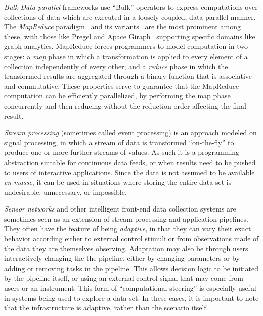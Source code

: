 {\em Bulk Data-parallel} frameworks use ``Bulk'' operators to express computations over 
collections of data which are executed in a loosely-coupled, data-parallel manner.
The {\em MapReduce} paradigm~\cite{MapReduce} and its variants~\cite{twister,hmr} are the most
prominent among these, with those like Pregel and Apace Giraph~\cite{pregel} supporting specific domains like
graph analytics. MapReduce forces programmers to model computation in two stages: 
a \emph{map} phase in which a transformation is applied to every element of a collection independently of every other;  and a \emph{reduce} phase in which the transformed results 
are aggregated through a binary function that is associative and commutative. 
These properties serve to guarantee that the MapReduce computation can be efficiently 
parallelized, by performing the map phase concurrently and
then reducing without the reduction order affecting the final result. 

{\em Stream processing} (sometimes called event processing) is an approach modeled 
on signal processing, in which a stream of data is transformed ``on-the-fly'' to produce one or
more further streams of values. As such it is a programming
abstraction suitable for continuous data feeds, or when results need
to be pushed to users of interactive applications. Since the data is
not assumed to be available \textit{en masse}, it can be used in
situations where storing the entire data set is undesirable,
unnecessary, or impossible. 

{\em Sensor networks} and other intelligent front-end data collection systems are sometimes seen as an extension of stream processing and application pipelines.
They often have the feature of being \emph{adaptive}, in that they can vary their exact behavior according either to external control stimuli or from observations made of the data they are 
themselves observing. Adaptation may also be through users interactively changing the
the pipeline, either by changing parameters or by adding or removing
tasks in the pipeline. This allows decision logic to be initiated by
the pipeline itself, or using an external control signal that may come
from users or an instrument. This form of ``computational steering''
is especially useful in systems being used to explore a data set. In these cases, it is important to 
note that the infrastructure is adaptive, rather than the scenario itself.


